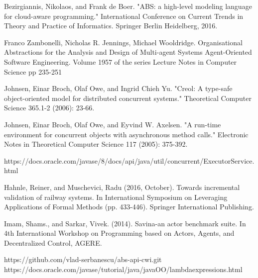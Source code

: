 \documentclass[runningheads,a4paper]{llncs}
\begin{document}
\begin{thebibliography}{4}
		 Bezirgiannis, Nikolaos, and Frank de Boer. "ABS: a high-level modeling language for cloud-aware programming." International Conference on Current Trends in Theory and Practice of Informatics. Springer Berlin Heidelberg, 2016.
		
		Franco Zambonelli, Nicholas R. Jennings, Michael Wooldridge. 
		Organisational Abstractions for the Analysis and Design of Multi-agent Systems
		Agent-Oriented Software Engineering. Volume 1957 of the series Lecture Notes in Computer Science pp 235-251
		
		 Johnsen, Einar Broch, Olaf Owe, and Ingrid Chieh Yu. "Creol: A type-safe object-oriented model for distributed concurrent systems." Theoretical Computer Science 365.1-2 (2006): 23-66.
		
		 Johnsen, Einar Broch, Olaf Owe, and Eyvind W. Axelsen. "A run-time environment for concurrent objects with asynchronous method calls." Electronic Notes in Theoretical Computer Science 117 (2005): 375-392.
		
		 https://docs.oracle.com/javase/8/docs/api/java/util/concurrent/ExecutorService.html
		
		Hahnle, Reiner, and Muschevici, Radu (2016, October). Towards incremental validation of railway systems. In International Symposium on Leveraging Applications of Formal Methods (pp. 433-446). Springer International Publishing.
		
		 Imam, Shams., and Sarkar, Vivek. (2014). Savina-an actor benchmark suite. In 4th International Workshop on Programming based on Actors, Agents, and Decentralized Control, AGERE.
		
		https://github.com/vlad-serbanescu/abs-api-cwi.git
		 https://docs.oracle.com/javase/tutorial/java/javaOO/lambdaexpressions.html
	\end{thebibliography}
	
\end{document}
